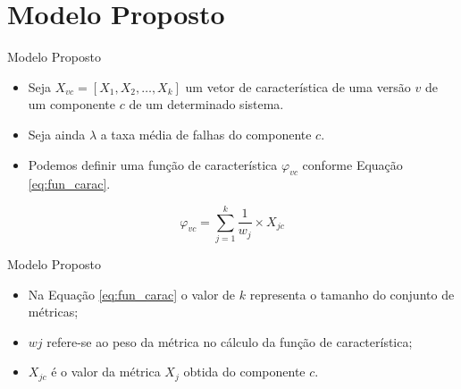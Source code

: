 \documentclass[t,14pt,mathserif]{beamer}
\begin{document}
\section{Modelo Proposto}
\begin{frame}{Modelo Proposto}
	\begin{itemize}
		\item Seja $X_{vc}=[X_1,X_2,\ldots,X_k]$ um vetor de característica de uma versão $v$ de
um componente $c$ de um determinado sistema.
		\item  Seja ainda $\lambda$ a taxa média de falhas do componente $c$.
		\item Podemos definir uma função de característica $\varphi_{vc}$ conforme Equação \ref{eq:fun_carac}{}.
	\end{itemize}
	\begin{equation} \label{eq:fun_carac}
    		\varphi_{vc} = \sum_{j=1}^{k} \frac{1}{w_{j}} \times X_{jc}
	\end{equation}

\end{frame}
\begin{frame}{Modelo Proposto}

	\begin{itemize}
		\item Na Equação \ref{eq:fun_carac} o valor de $k$ representa o tamanho do conjunto de
métricas;
		\item $w{j}$ refere-se ao peso da métrica no cálculo da função de característica;
		\item  $X_{jc}$ é o valor da métrica $X_j$ obtida do componente $c$.
		
	\end{itemize}
	
\end{frame}
\end{document}
